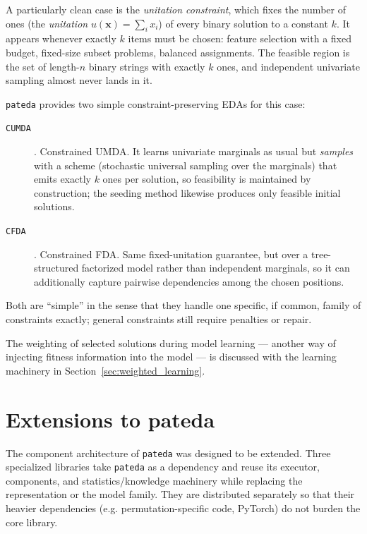 \documentclass[a4paper,11pt]{article}
\begin{document}
A particularly clean case is the \emph{unitation constraint}, which fixes the
number of ones (the \emph{unitation} $u(\mathbf{x})=\sum_i x_i$) of every binary
solution to a constant $k$. It appears whenever exactly $k$ items must be chosen:
feature selection with a fixed budget, fixed-size subset problems, balanced
assignments. The feasible region is the set of length-$n$ binary strings with
exactly $k$ ones, and independent univariate sampling almost never lands in it.

\texttt{pateda} provides two simple constraint-preserving EDAs for this case:

\begin{description}
  \item[\texttt{CUMDA}] \citep{Santana_and_Ochoa:1999b}.
    Constrained UMDA. It learns univariate marginals as usual but \emph{samples}
    with a scheme (stochastic universal sampling over the marginals) that emits
    exactly $k$ ones per solution, so feasibility is maintained by construction;
    the seeding method likewise produces only feasible initial solutions.
  \item[\texttt{CFDA}] \citep{Santana_et_al:2001c}.
    Constrained FDA. Same fixed-unitation guarantee, but over a tree-structured
    factorized model rather than independent marginals, so it can additionally
    capture pairwise dependencies among the chosen positions.
\end{description}

Both are ``simple'' in the sense that they handle one specific, if common, family
of constraints exactly; general constraints still require penalties or repair.

The weighting of selected solutions during model learning --- another way of
injecting fitness information into the model --- is discussed with the learning
machinery in Section~\ref{sec:weighted_learning}.



\section{Extensions to pateda}
\label{sec:extensions}

The component architecture of \texttt{pateda} was designed to be extended. Three
specialized libraries take \texttt{pateda} as a dependency and reuse its
executor, components, and statistics/knowledge machinery while replacing the
representation or the model family. They are distributed separately so that their
heavier dependencies (e.g. permutation-specific code, PyTorch) do not burden the
core library.
\end{document}
